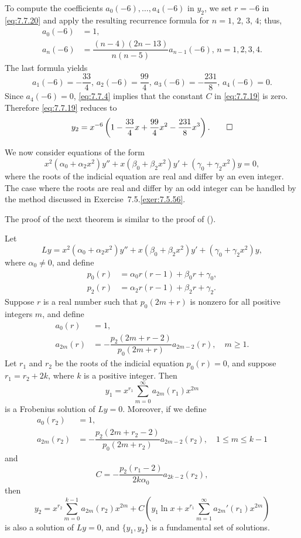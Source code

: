 \begin{solution}
To compute the coefficients
$a_0(-6),\dots,a_4(-6)$ in $y_2$, we
set $r=-6$ in \eqref{eq:7.7.20} and apply the resulting recurrence
formula for $n=1$, $2$, $3$, $4$;   thus,
\begin{align*}
a_0(-6)&=1,\\
a_n(-6)&=\dfrac{(n-4)(2n-13)}{n(n-5)}a_{n-1}(-6),\,n=1,2,3,4.
\end{align*}
The last formula yields
\[
a_1(-6)=-\frac{33}{4},\,a_2(-6)=\frac{99}{4},\,a_3(-6)=-\frac{231}{8},\,a_4(-6)=0.
\]
Since $a_4(-6)=0$, \eqref{eq:7.7.4} implies that the constant $C$
in \eqref{eq:7.7.19} is zero. Therefore \eqref{eq:7.7.19} reduces
to
\[
y_2=x^{-6}\left(1-\frac{33}{4}x+\frac{99}{4}x^2-\frac{231}{8}x^3\right).
\qedhere
\]
\end{solution}

We now consider   equations  of the form
\[
x^2(\alpha_0+\alpha_2x^2)y''+x(\beta_0+\beta_2x^2)y'
+(\gamma_0+\gamma_2x^2)y=0,
\]
where the roots of the indicial equation are real and differ by an
even integer. The case where the roots are real and differ by an odd
integer can be handled by the method discussed in
{Exercise~7.5.\ref{exer:7.5.56}}.

The  proof of the next theorem is similar to the proof of
 ().

\begin{theorem}\label{thmtype:7.7.2}
Let
\[
Ly=
x^2(\alpha_0+\alpha_2x^2)y''+x(\beta_0+\beta_2x^2)y'
+(\gamma_0+\gamma_2x^2)y,
\]
where $\alpha_0\ne0$, and  define
\begin{align*}
p_0(r)&=\alpha_0r(r-1)+\beta_0r+\gamma_0,\\[5pt]
p_2(r)&=\alpha_2r(r-1)+\beta_2r+\gamma_2.
\end{align*}
Suppose    $r$ is a real number such that $p_0(2m+r)$ is nonzero
for all positive integers $m$, and  define
\begin{equation} \label{eq:7.7.22}
\begin{aligned}
a_0(r)&=1,\\
a_{2m}(r)&=-\dfrac{p_2(2m+r-2)}{p_0(2m+r)}a_{2m-2}(r),\quad m\ge1.
\end{aligned}
\end{equation}
Let $r_1$ and $r_2$ be the roots of the indicial equation
$p_0(r)=0$, and suppose   $r_1=r_2+2k$, where $k$ is a positive
integer.  Then
\[
y_1=x^{r_1}\sum_{m=0}^\infty  a_{2m}(r_1)x^{2m}
\]
is a Frobenius solution of $Ly=0$.
Moreover, if we define
\begin{align*}
a_0(r_2)&=1,\\
a_{2m}(r_2)&=-\dfrac{p_2(2m+r_2-2)}{p_0(2m+r_2)}a_{2m-2}(r_2),\quad
1\le m\le k-1
\end{align*}
and
\begin{equation} \label{eq:7.7.23}
C=-\frac{p_2(r_1-2)}{2k\alpha_0}a_{2k-2}(r_2),
\end{equation}
then
\begin{equation} \label{eq:7.7.24}
y_2=x^{r_2}\sum_{m=0}^{k-1}a_{2m}(r_2)x^{2m}+C\left(y_1\ln
x+x^{r_1}\sum_{m=1}^\infty a_{2m}'(r_1)x^{2m}\right)
\end{equation}
is also a   solution of $Ly=0$, and $\{y_1,y_2\}$
is a fundamental set of  solutions.
\end{theorem}


